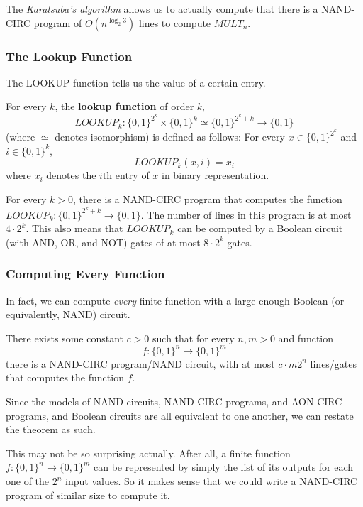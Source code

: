 \documentclass{article}
\begin{document}
  The \textit{Karatsuba's algorithm} allows us to actually compute that there is a NAND-CIRC program of $O(n^{\log_2 3})$ lines to compute $MULT_n$. 

  \subsubsection{The Lookup Function}
  The LOOKUP function tells us the value of a certain entry. 
  \begin{definition}
  For every $k$, the \textbf{lookup function} of order $k$, 
  \[LOOKUP_k: \{0,1\}^{2^k} \times \{0,1\}^k \simeq \{0,1\}^{2^k + k} \longrightarrow \{0,1\}\]
  (where $\simeq$ denotes isomorphism) is defined as follows: For every $x \in \{0,1\}^{2^k}$ and $i \in \{0,1\}^k$, 
  \[LOOKUP_k (x, i) = x_i\]
  where $x_i$ denotes the $i$th entry of $x$ in binary representation. 
  \end{definition}

  \begin{theorem}
  For every $k > 0$, there is a NAND-CIRC program that computes the function $LOOKUP_k: \{0,1\}^{2^k + k} \longrightarrow \{0,1\}$. The number of lines in this program is at most $4 \cdot 2^k$. This also means that $LOOKUP_k$ can be computed by a Boolean circuit (with AND, OR, and NOT) gates of at most $8 \cdot 2^k$ gates. 
  \end{theorem}

  \subsubsection{Computing Every Function}

  In fact, we can compute \textit{every} finite function with a large enough Boolean (or equivalently, NAND) circuit. 

  \begin{theorem}
  There exists some constant $c > 0$ such that for every $n, m > 0$ and function
  \[f: \{0,1\}^n \longrightarrow \{0,1\}^m\]
  there is a NAND-CIRC program/NAND circuit,  with at most $c \cdot m 2^n$ lines/gates that computes the function $f$. 
  \end{theorem}

  Since the models of NAND circuits, NAND-CIRC programs, and AON-CIRC programs, and Boolean circuits are all equivalent to one another, we can restate the theorem as such. 

  This may not be so surprising actually. After all, a finite function $f: \{0,1\}^n \longrightarrow \{0,1\}^m$ can be represented by simply the list of its outputs for each one of the $2^n$ input values. So it makes sense that we could write a NAND-CIRC program of similar size to compute it. 
\end{document}
